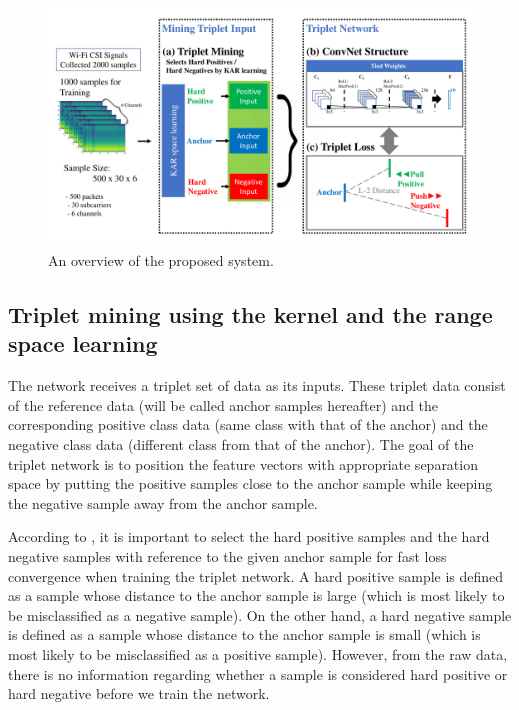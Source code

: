 \documentclass[sigconf]{acmart}
\begin{document}
\begin{figure}[!ht]
    \includegraphics[width=\textwidth]{fig1_tcnn_kar_v6}
    \caption{An overview of the proposed system.} \label{fig1}
\end{figure}

\subsection{Triplet mining using the kernel and the range space learning}

The network receives a triplet set of data as its inputs. These triplet data consist of the reference data (will be called anchor samples hereafter) and the corresponding positive class data (same class with that of the anchor) and the negative class data (different class from that of the anchor). The goal of the triplet network is to position the feature vectors with appropriate separation space by putting the positive samples close to the anchor sample while keeping the negative sample away from the anchor sample.

According to \cite{schroff2015facenet}, it is important to select the hard positive samples and the hard negative samples with reference to the given anchor sample for fast loss convergence when training the triplet network.
A hard positive sample is defined as a sample whose distance to the anchor sample is large (which is most likely to be misclassified as a negative sample). On the other hand, a hard negative sample is defined as a sample whose distance to the anchor sample is small (which is most likely to be misclassified as a positive sample). However, from the raw data, there is no information regarding whether a sample is considered hard positive or hard negative before we train the network.
\end{document}
